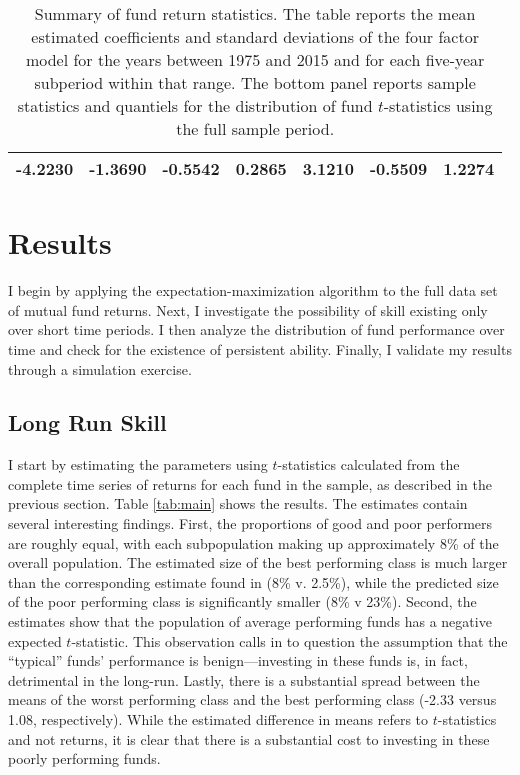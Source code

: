 \begin{table}[p]
\begin{tabular}{*{7}{c}}
		\midrule
		-4.2230 & -1.3690 & -0.5542 & 0.2865 & 3.1210 & -0.5509 & 1.2274 \\
		\bottomrule
		\end{tabular}
		\captionsetup{position=below, font=footnotesize, justification=justified, width=0.83\linewidth}
		\caption[Summary of fund return statistics]{Summary of fund return statistics. The table reports the mean estimated coefficients and standard deviations of the \citet{Carhart1997} four factor model for the years between 1975 and 2015 and for each five-year subperiod within that range. The bottom panel reports sample statistics and quantiels for the distribution of fund $t$-statistics using the full sample period.}
		\label{tab:summary}
	\end{table}


\section{Results}
	I begin by applying the expectation-maximization algorithm to the full data set of mutual fund returns. Next, I investigate the possibility of skill existing only over short time periods. I then analyze the distribution of fund performance over time and check for the existence of persistent ability. Finally, I validate my results through a simulation exercise.

	\subsection{Long Run Skill}
		I start by estimating the parameters using $t$-statistics calculated from the complete time series of returns for each fund in the sample, as described in the previous section. Table \ref{tab:main} shows the results. The estimates contain several interesting findings.  First, the proportions of good and poor performers are roughly equal, with each subpopulation making up approximately 8\% of the overall population.  The estimated size of the best performing class is much larger than the corresponding estimate found in \citet{Barras2010} (8\% v. 2.5\%), while the predicted size of the poor performing class is significantly smaller (8\% v 23\%). Second, the estimates show that the population of average performing funds has a negative expected $t$-statistic.  This observation calls in to question the assumption that the ``typical'' funds' performance is benign---investing in these funds is, in fact, detrimental in the long-run.  Lastly, there is a substantial spread between the means of the worst performing class and the best performing class (-2.33 versus 1.08, respectively). While the estimated difference in means refers to $t$-statistics and not returns, it is clear that there is a substantial cost to investing in these poorly performing funds.

